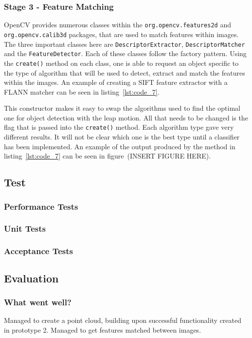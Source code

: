 \documentclass[11pt,oneside]{report}
\newcommand\code[1]{\texttt{#1}}
\begin{document}
		\subsubsection{Stage 3 - Feature Matching}
			OpenCV provides numerous classes within the \code{org.opencv.features2d} and \code{org.opencv.calib3d} packages, that are used to match features within images.
			The three important classes here are \code{DescriptorExtractor}, \code{DescriptorMatcher} and the \code{FeatureDetector}.
			Each of these classes follow the factory pattern.
			Using the \code{create()} method on each class, one is able to request an object specific to the type of algorithm that will be used to detect, extract and match the features within the images.
			An example of creating a SIFT feature extractor with a FLANN matcher can be seen in listing~\ref{lst:code_7}.
			
			This constructor makes it easy to swap the algorithms used to find the optimal one for object detection with the leap motion.
			All that needs to be changed is the flag that is passed into the \code{create()} method.
			Each algorithm type gave very different results.
			It will not be clear which one is the best type until a classifier has been implemented.
			An example of the output produced by the method in listing~\ref{lst:code_7} can be seen in figure~(INSERT FIGURE HERE).
		\subsection{Test}
			\subsubsection{Performance Tests}
			\subsubsection{Unit Tests}
			\subsubsection{Acceptance Tests}
			
		\subsection{Evaluation}
			\subsubsection{What went well?}
			Managed to create a point cloud, building upon successful functionality created in prototype 2.
			Managed to get features matched between images.
\end{document}
